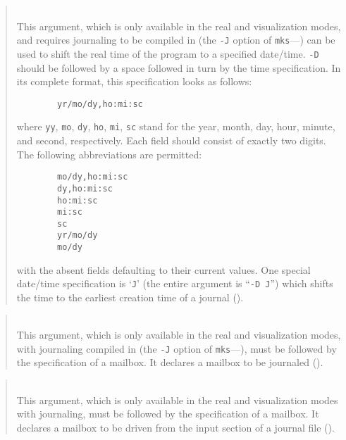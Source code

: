 \begin{quote}
\noindent{}\\ \hspace{0in}
This argument, which is only available in the real and visualization modes,
and requires journaling to be compiled in
(the {\tt -J} option of {\tt mks}---)
can be used to
shift the real time of the program to a specified date/time.
{\tt -D} should be followed by a space followed in turn
by the time specification.
In its complete format, this specification looks as follows:
\begin{verbatim}
        yr/mo/dy,ho:mi:sc
\end{verbatim}
where {\tt yy}, {\tt mo}, {\tt dy}, {\tt ho}, {\tt mi}, {\tt sc} stand for
the year, month, day, hour, minute, and second, respectively.
Each field should consist of exactly two digits.
The following abbreviations are permitted:
\begin{verbatim}
        mo/dy,ho:mi:sc
        dy,ho:mi:sc
        ho:mi:sc
        mi:sc
        sc
        yr/mo/dy
        mo/dy
\end{verbatim}
with the absent fields defaulting to their current values.
One special date/time specification is `{\tt J}' (the entire argument
is ``{\tt -D~J}'') which shifts the time to the earliest creation time
of a journal ().
\end{quote}

\begin{quote}
\noindent{}\\ \hspace{0in}
This argument, which is only available in the real and visualization
modes, with journaling compiled in
(the {\tt -J} option of {\tt mks}---), must be followed
by the specification of a mailbox.
It declares a mailbox to be journaled ().
\end{quote}

\begin{quote}
\noindent{}\\ \hspace{0in}
This argument, which is only available in the real and visualization
modes with journaling, must be followed
by the specification of a mailbox.
It declares a mailbox to be driven from the input section of a journal
file ().
\end{quote}

